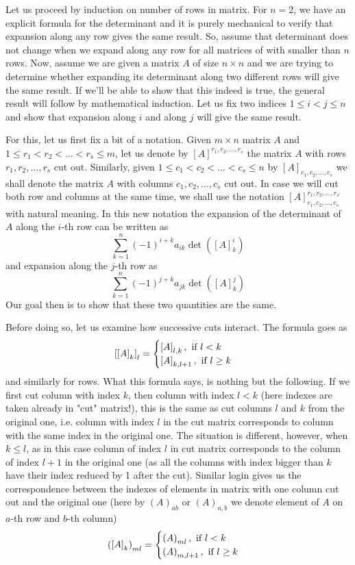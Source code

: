 \documentclass[8pt]{article} %
\begin{document}
Let us proceed by induction on number of rows in matrix.
For $n=2$, we have an explicit formula for the determinant and it is purely mechanical to verify that expansion
along any row gives the same result. So, assume that determinant does not change when we expand along any row for all matrices of with smaller
than $n$ rows. Now,
assume we are given a matrix $A$ of size $n\times n$ and we are trying to determine whether expanding its determinant along two different
rows will give the same result. If we'll be able to show that this indeed is true, the general result will follow by mathematical induction. Let
us fix two indices $1\leq i<j\leq n$ and show that expansion along $i$ and along $j$ will give the same result.

For this, let us first fix a bit of a notation. Given $m\times n$ matrix $A$ and
$1\leq r_1<r_2<\hdots<r_s\leq m$, let us denote by $[A]^{r_1,r_2,\hdots,r_s}$
the matrix $A$ with rows $r_1, r_2,\hdots,r_s$ cut out.
Similarly, given $1\leq c_1<c_2<\hdots<c_s\leq n$
by $[A]_{c_1,c_2,\hdots,c_s}$ we shall denote the matrix $A$ with columns $c_1,c_2,\hdots,c_s$ cut out. In case we will cut both row and columns
at the same time, we shall use the notation $[A]_{c_1,c_2,\hdots,c_s}^{r_1,r_2,\hdots,r_{s'}}$ with natural meaning. In this new notation the 
expansion of the determinant of $A$ along the $i$-th row can be written as
\[\sum_{k=1}^n(-1)^{i+k}a_{ik}\det([A]_k^i)\]
and expansion along the $j$-th row as
\[\sum_{k=1}^n(-1)^{j+k}a_{jk}\det([A]_k^j)\]
Our goal then is to show that these two quantities are the same.

Before doing so, let us examine how successive cuts interact. The formula goes as
\[\left[\left[A\right]_k\right]_l=\begin{cases}\left[A\right]_{l,k},\mbox{ if }l<k\\\left[A\right]_{k,l+1},\mbox{ if }l\geq k\end{cases}\]
	and similarly for rows. What this formula says, is nothing but the following. If we first cut column with index
	$k$, then column with index $l<k$ (here indexes are taken already in "cut" matrix!), this is the same as cut columns $l$ and $k$ from the 
	original one, i.e. column with index $l$ in the cut matrix corresponds to column with the same index in the original one. The situation is
	different, however, when $k\leq l$, as in this case column of index $l$ in cut matrix corresponds to the column of index
	$l+1$ in the original
	one (as all the columns with index bigger than $k$ have their index reduced by 1 after the cut). Similar login gives us the correspondence
	between the indexes of elements in matrix with one
	column cut out and the original one (here by $(A)_{ab}$ or $(A)_{a,b}$ we denote element of $A$ on $a$-th row and $b$-th 
	column)
	\[\left(\left[A\right]_k\right)_{ml}=\begin{cases}
		\left(A\right)_{ml},\mbox{ if }l<k\\
		\left(A\right)_{m,l+1},\mbox{ if }l\geq k
	\end{cases}\]
\end{document}
